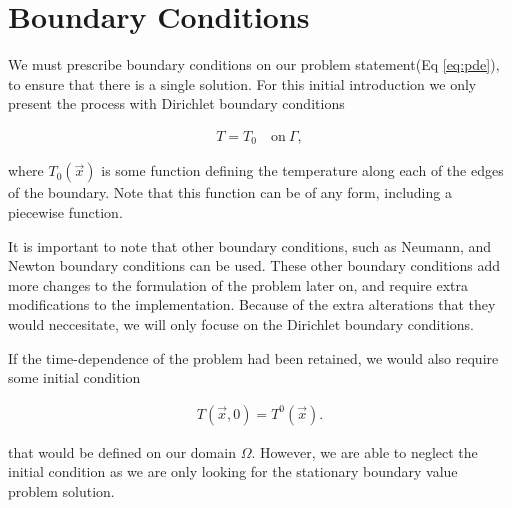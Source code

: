 \documentclass[../fem.tex]{subfiles}
\begin{document}
\section{Boundary Conditions}%
\label{sec:boundary_conditions}

We must prescribe boundary conditions on our problem statement(Eq
\ref{eq:pde}), to ensure that there is a single solution. For this initial
introduction we only present the process with Dirichlet boundary conditions

\begin{align*}
  T=T_0\quad\text{on}\ \Gamma,
\end{align*}

where $T_0(\vec{x})$ is some function defining the temperature along each of
the edges of the boundary. Note that this function can be of any form,
including a piecewise function.

It is important to note that other boundary conditions, such as Neumann, and
Newton boundary conditions can be used. These other boundary conditions add
more changes to the formulation of the problem later on, and require extra
modifications to the implementation. Because of the extra alterations that they
would neccesitate, we will only focuse on the Dirichlet boundary conditions.

If the time-dependence of the problem had been retained, we would also require
some initial condition

\begin{align*}
  T(\vec{x}, 0) = T^0(\vec{x}).
\end{align*}

that would be defined on our domain $\Omega$. However, we are able to neglect
the initial condition as we are only looking for the stationary boundary value
problem solution.
\end{document}
